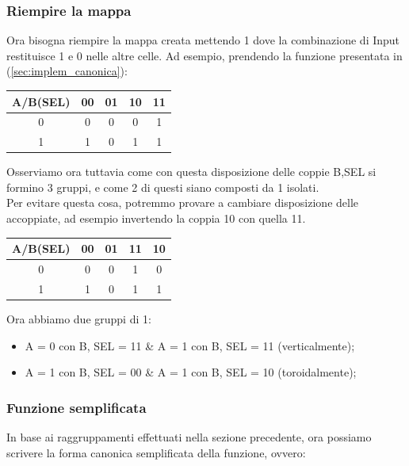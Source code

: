 \documentclass[12pt]{article}
\begin{document}
\subsubsection{Riempire la mappa}
Ora bisogna riempire la mappa creata mettendo 1 dove la combinazione di Input restituisce 1 e 0 nelle altre celle.
Ad esempio, prendendo la funzione presentata in (\ref{sec:implem_canonica}):
\begin{center}
    \begin{tabular}{|| c | c c c c ||}
        \hline
        A/B(SEL) & 00 & 01 & 10 & 11 \\
        \hline
        0 & 0 & 0 & 0 & 1 \\
        \hline
        1 & 1 & 0 & 1 & 1 \\
        \hline
    \end{tabular}
\end{center}
Osserviamo ora tuttavia come con questa disposizione delle coppie B,SEL si formino 3 gruppi, e come 2 di questi siano composti da 1 isolati.\\
Per evitare questa cosa, potremmo provare a cambiare disposizione delle accoppiate, ad esempio invertendo la coppia 10 con quella 11.
\begin{center}
    \begin{tabular}{|| c | c c c c ||}
        \hline
        A/B(SEL) & 00 & 01 & 11 & 10 \\
        \hline
        0 & 0 & 0 & 1 & 0 \\
        \hline
        1 & 1 & 0 & 1 & 1 \\
        \hline
    \end{tabular}
\end{center}
Ora abbiamo due gruppi di 1:
\begin{itemize}
    \item A = 0 con B, SEL = 11 \& A = 1 con B, SEL = 11 (verticalmente);
    \item A = 1 con B, SEL = 00 \& A = 1 con B, SEL = 10 (toroidalmente);
\end{itemize}
\subsubsection{Funzione semplificata}
In base ai raggruppamenti effettuati nella sezione precedente, ora possiamo scrivere la forma canonica semplificata della funzione, ovvero:
\end{document}
